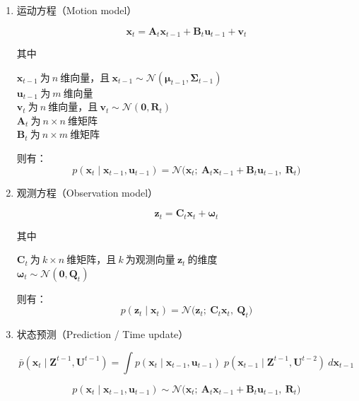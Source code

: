 \documentclass[../main.tex]{subfiles}
\begin{document}
\begin{enumerate}
{{\begin{enumerate}
  \item 运动方程（Motion model）
  
  $$\mathbf{x}_t = \mathbf{A}_t \mathbf{x}_{t-1} + \mathbf{B}_t \mathbf{u}_{t-1} + \mathbf{v}_t$$
  
  其中\\
  \begin{flushleft}
  $ \mathbf{x}_{t-1}\ \text{为}\ n\ \text{维向量，且}\ \mathbf{x}_{t-1}\sim\mathcal{N}(\boldsymbol{\mu}_{t-1},\boldsymbol{\Sigma}_{t-1})$\\
  $ \mathbf{u}_{t-1}\ \text{为}\ m\ \text{维向量}$\\
  $ \mathbf{v}_t\ \text{为}\ n\ \text{维向量，且}\ \mathbf{v}_t\sim\mathcal{N}(\mathbf{0},\mathbf{R}_t)$\\
  $ \mathbf{A}_t\ \text{为}\ n\times n\ \text{维矩阵}$\\
  $ \mathbf{B}_t\ \text{为}\ n\times m\ \text{维矩阵}$
  \end{flushleft}
    则有：
  $$p(\mathbf{x}_t\mid \mathbf{x}_{t-1},\mathbf{u}_{t-1})=\mathcal{N}\big(\mathbf{x}_t;\ \mathbf{A}_t\mathbf{x}_{t-1}+\mathbf{B}_t\mathbf{u}_{t-1},\ \mathbf{R}_t\big)$$

  \item 观测方程（Observation model）
  
  $$\mathbf{z}_t = \mathbf{C}_t \mathbf{x}_t + \boldsymbol{\omega}_t$$
  
  其中\\
  \begin{flushleft}
  $ \mathbf{C}_t\ \text{为}\ k\times n\ \text{维矩阵，且}\ k\ \text{为观测向量}\ \mathbf{z}_t\ \text{的维度}$\\
  $ \boldsymbol{\omega}_t\sim\mathcal{N}(\mathbf{0},\mathbf{Q}_t)$
  \end{flushleft}
则有：
  $$p(\mathbf{z}_t\mid \mathbf{x}_t)=\mathcal{N}\big(\mathbf{z}_t;\ \mathbf{C}_t\mathbf{x}_t,\ \mathbf{Q}_t\big)$$

  \item 状态预测（Prediction / Time update）
  
  $$\bar{p}(\mathbf{x}_t\mid \mathbf{Z}^{t-1},\mathbf{U}^{t-1})=\int p(\mathbf{x}_t\mid \mathbf{x}_{t-1},\mathbf{u}_{t-1})\;p(\mathbf{x}_{t-1}\mid \mathbf{Z}^{t-1},\mathbf{U}^{t-2})\ d\mathbf{x}_{t-1}$$
  
  $$p(\mathbf{x}_t\mid \mathbf{x}_{t-1},\mathbf{u}_{t-1})\sim\mathcal{N}\big(\mathbf{x}_t;\ \mathbf{A}_t\mathbf{x}_{t-1}+\mathbf{B}_t\mathbf{u}_{t-1},\ \mathbf{R}_t\big)$$
  

\end{enumerate}}}
\end{enumerate}
\end{document}
